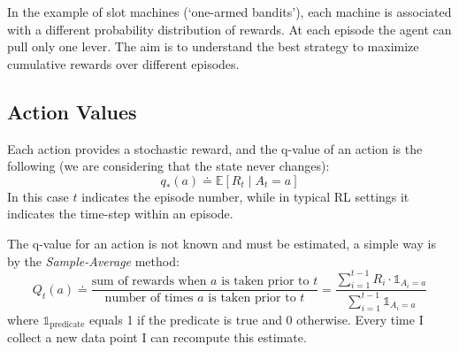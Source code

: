 In the example of slot machines (`one-armed bandits'), each machine is associated with a different probability distribution of rewards. At each episode the agent can pull only one lever. The aim is to understand the best strategy to maximize cumulative rewards over different episodes. 

\subsection{Action Values}
Each action provides a stochastic reward, and the q-value of an action is the following (we are considering that the state never changes):
\[q_*(a)\doteq\mathbb{E}[R_t\mid A_t=a]\]
In this case $t$ indicates the episode number, while in typical RL settings it indicates the time-step within an episode.

The q-value for an action is not known and must be estimated, a simple way is by the \textit{Sample-Average} method:
\[Q_t(a)\doteq\frac{\text{sum of rewards when }a\text{ is taken prior to }t}{\text{number of times }a\text{ is taken prior to }t}=\frac{\sum_{i=1}^{t-1}R_i\cdot\mathds{1}_{A_i=a}}{\sum_{i=1}^{t-1}\mathds{1}_{A_i=a}}\]
where $\mathds{1}_{\text{predicate}}$ equals 1 if the predicate is true and 0 otherwise. Every time I collect a new data point I can recompute this estimate.

